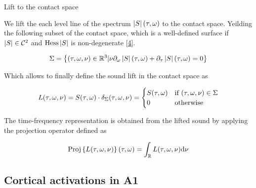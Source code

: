 \documentclass[10pt,american,ignorenonframetext,aspectratio=1610]{beamer}
\theoremstyle{remark}
\begin{document}
\begin{frame}{Lift to the contact space}
\protect\hypertarget{lift-to-the-contact-space}{}

We lift the each level line of the spectrum \(\left\lvert S\right\rvert(\tau,\omega)\) to the
contact space. Yeilding the following subset of the contact space, which
is a well-defined surface if \(\left\lvert S\right\rvert\in\mathcal{C}^2\) and
\(\mathrm{Hess}\left\lvert S\right\rvert\) is non-degenerate
{[}\protect\hyperlink{ref-boscain2021}{4}{]}.

\[\Sigma = \left\{(\tau,\omega,\nu)\in\mathbb{R}^3 \vert\nu\partial_\omega\left\lvert S\right\rvert(\tau,\omega) + \partial_\tau\left\lvert S\right\rvert(\tau,\omega) = 0\right\}\]

Which allows to finally define the sound lift in the contact space as

\[L(\tau,\omega,\nu) = S(\tau,\omega)\cdot\delta_\Sigma (\tau,\omega,\nu) =
\begin{cases}
S(\tau,\omega) & \text{if}~(\tau,\omega,\nu)\in\Sigma\\
0          & \text{otherwise}
\end{cases}\]

The time-frequency representation is obtained from the lifted sound by
applying the projection operator defined as

\[\mathrm{Proj}\left\{L(\tau,\omega,\nu)\right\}(\tau,\omega) = \int_{\mathbb{R}} L(\tau,\omega,\nu)\mathrm{d}\nu\]

\end{frame}

\hypertarget{cortical-activations-in-a1}{%
\subsection{Cortical activations in
A1}\label{cortical-activations-in-a1}}
\end{document}
